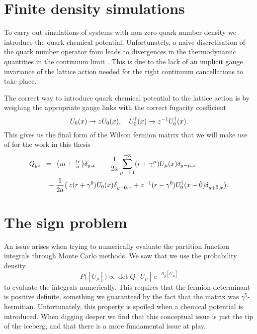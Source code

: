 \section{Finite density simulations} \label{sec-finite-density-lattice}

To carry out simulations of systems with non zero quark number density we
introduce the quark chemical potential. Unfortunately, a naive discretisation 
of the quark number operator from  leads to
divergences in the thermodynamic quantities in the continuum limit
\citep{Hasenfratz:1983ba,Kogut:1983ia}. This is due to the lack of an implicit
gauge invariance of the lattice action needed for the right continuum
cancellations to take place.

The correct way to introduce quark chemical potential to the lattice action is
by weighing the appropriate gauge links with the correct fugacity coefficient
%
\begin{equation}
  U_0(x) \to z U_0(x), \hskip1em U_0^{\dagger}(x) \to z^{-1}
    U_0^{\dagger}(x).
\end{equation}
%
This gives us the final form of the Wilson fermion matrix that we will make use
of for the work in this thesis
%
\begin{align}
  Q_{yx} \hskip1ex&=\hskip1ex \big(m + {\textstyle\frac{4 r}{a}}\big) \delta_{y,x}
  \hskip1ex-\hskip1ex \frac{1}{2a} \sum_{\mu=\pm 1}^{\pm 3} (r + \gamma^{\mu}) U_{\mu}(x) \delta_{y- \hat{\mu},x} \nonumber\\
   &\hskip1ex - \frac{1}{2a} \big(\, z (r+\gamma^0) U_0(x) \delta_{y-\hat{0},x}
   + z^{-1}(r-\gamma^0) U_0^{\dagger}(x-\hat{0}) \delta_{y+\hat{0},x} \big).
\end{align}

\section{The sign problem} \label{sec-sign-problem}

An issue arises when trying to numerically evaluate the partition function
integrals through Monte Carlo methods. We saw that we use the probability
density
%
\begin{equation}
  P\big([U_{\mu}]\big) \propto \det Q [U_{\mu}] \, e^{-\mathcal{S}_g[U_{\mu}]}
\end{equation}
%
to evaluate the integrals numerically. This requires that the fermion
determinant is positive definite, something we guaranteed by the fact that the
matrix was $\gamma^5$-hermitian. Unfortunately, this property is spoiled when a
chemical potential is introduced. When digging deeper we find that this
conceptual issue is just the tip of the iceberg, and that there is a more
fundamental issue at play.

